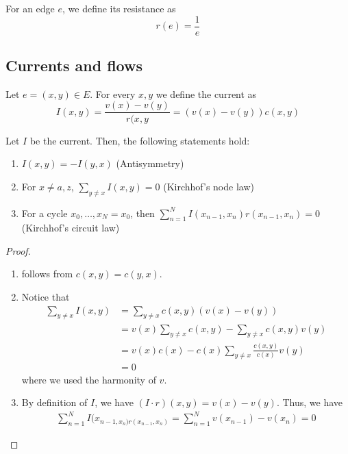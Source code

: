 \begin{defn}[Resistance]
    For an edge $e$, we define its resistance as
    \[r(e)= \frac{1}{e}\]
\end{defn}


\subsection{Currents and flows}

\begin{defn}[Current]
    Let $e=(x,y) \in E$. For every \(x,y\) we define the current as
    \[I(x,y) = \frac{v(x)-v(y)}{r(x,y} = \left(v(x)-v(y)\right) c(x,y)\]
\end{defn}


\begin{lem}
    Let $I$ be the current. Then, the following statements hold:
    \begin{enumerate}
      \item \(I(x,y) = -I(y,x)\) (Antisymmetry) 
      \item For $x\neq a,z$, $\sum_{y\neq x} I(x,y) = 0$ (Kirchhof's node law)
      \item For a cycle ${x}_{0} , \dots , {x}_{N}=x_0 $, then \(\sum_{n=1}^{N} I(x_{n-1},x_n)r(x_{n-1},x_n) = 0\) (Kirchhof's circuit law)
    \end{enumerate}
    
\end{lem}

\begin{proof}
    \begin{enumerate}
      \item follows from $c(x,y)=c(y,x)$.
      \item Notice that 
        \begin{align*}
          \sum_{y\neq x}I(x,y) &= \sum_{y\neq x}c(x,y) \left(v(x)-v(y)\right) \\
                               &=v(x)\sum_{y\neq x}c(x,y) - \sum_{y\neq x}c(x,y)v(y) \\
                               &=v(x)c(x) - c(x)\sum_{y\neq x}\frac{c(x,y)}{c(x)}v(y) \\
                               &=0
        \end{align*}
        where we used the harmonity of $v$.
      \item By definition of $I$, we have $(I\cdot r)(x,y)=v(x)-v(y)$. Thus, we have 
        \begin{align*}
          \sum_{n=1}^{N} I(x_{n-1,x_n)r(x_{n-1},x_n)} = \sum_{n=1}^{N} v(x_{n-1})-v(x_n) = 0
        \end{align*}        
    \end{enumerate}
\end{proof}


